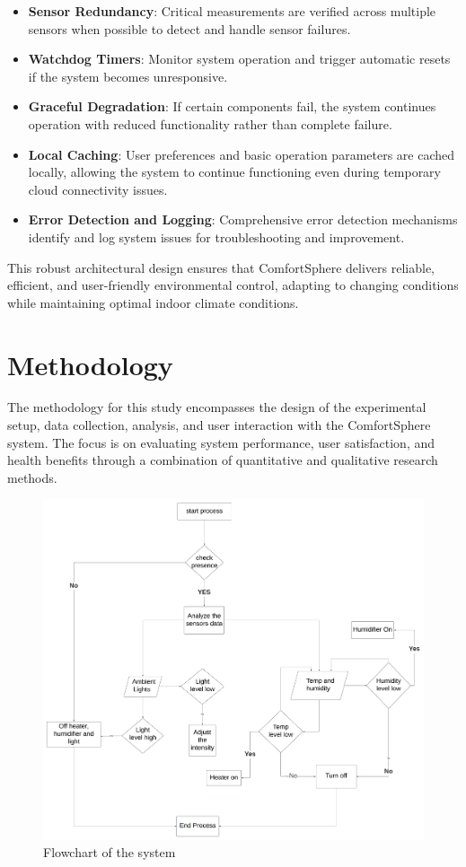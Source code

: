 \documentclass[a4paper]{scrartcl}
\begin{document}
	\begin{itemize}
		\item \textbf{Sensor Redundancy}: Critical measurements are verified across multiple sensors when possible to detect and handle sensor failures.
		\item \textbf{Watchdog Timers}: Monitor system operation and trigger automatic resets if the system becomes unresponsive.
		\item \textbf{Graceful Degradation}: If certain components fail, the system continues operation with reduced functionality rather than complete failure.
		\item \textbf{Local Caching}: User preferences and basic operation parameters are cached locally, allowing the system to continue functioning even during temporary cloud connectivity issues.
		\item \textbf{Error Detection and Logging}: Comprehensive error detection mechanisms identify and log system issues for troubleshooting and improvement.
	\end{itemize}
	
	This robust architectural design ensures that ComfortSphere delivers reliable, efficient, and user-friendly environmental control, adapting to changing conditions while maintaining optimal indoor climate conditions.

	\section{Methodology}
	\label{sec:methodology}
	The methodology for this study encompasses the design of the experimental setup, data collection, analysis, and user interaction with the ComfortSphere system. The focus is on evaluating system performance, user satisfaction, and health benefits through a combination of quantitative and qualitative research methods.

	\begin{figure}[th]
		\centering
		\includegraphics[width=\linewidth]{flowChart.png}
		\caption{Flowchart of the system}
		\label{fig:my_label}
	\end{figure}
\end{document}
